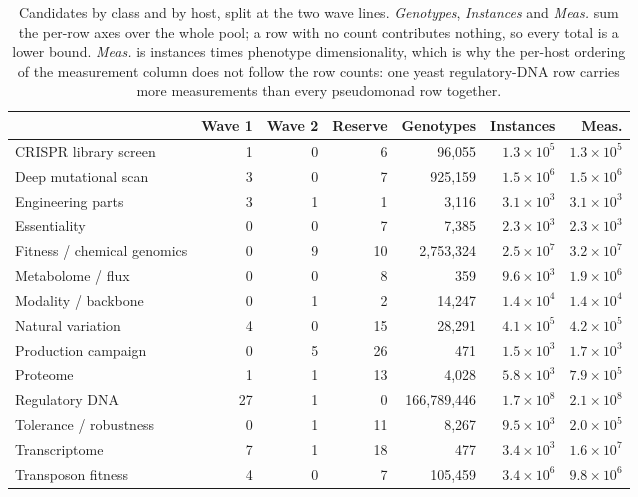 \begin{table}[H]\centering
\small
\caption[]{Candidates by class and by host, split at the two wave lines.
\emph{Genotypes}, \emph{Instances} and \emph{Meas.} sum the per-row axes over the whole
pool; a row with no count contributes nothing, so every total is a lower bound.
\emph{Meas.} is instances times phenotype dimensionality, which is why the per-host
ordering of the measurement column does not follow the row counts: one yeast
regulatory-DNA row carries more measurements than every pseudomonad row together.}
\label{tab:counts}
\begin{tabular}{@{}l r r r r r r@{}}
\toprule
 & Wave 1 & Wave 2 & Reserve & Genotypes & Instances & Meas. \\
\midrule
CRISPR library screen & 1 & 0 & 6 & 96,055 & $1.3\times 10^{5}$ & $1.3\times 10^{5}$ \\
Deep mutational scan & 3 & 0 & 7 & 925,159 & $1.5\times 10^{6}$ & $1.5\times 10^{6}$ \\
Engineering parts & 3 & 1 & 1 & 3,116 & $3.1\times 10^{3}$ & $3.1\times 10^{3}$ \\
Essentiality & 0 & 0 & 7 & 7,385 & $2.3\times 10^{3}$ & $2.3\times 10^{3}$ \\
Fitness / chemical genomics & 0 & 9 & 10 & 2,753,324 & $2.5\times 10^{7}$ & $3.2\times 10^{7}$ \\
Metabolome / flux & 0 & 0 & 8 & 359 & $9.6\times 10^{3}$ & $1.9\times 10^{6}$ \\
Modality / backbone & 0 & 1 & 2 & 14,247 & $1.4\times 10^{4}$ & $1.4\times 10^{4}$ \\
Natural variation & 4 & 0 & 15 & 28,291 & $4.1\times 10^{5}$ & $4.2\times 10^{5}$ \\
Production campaign & 0 & 5 & 26 & 471 & $1.5\times 10^{3}$ & $1.7\times 10^{3}$ \\
Proteome & 1 & 1 & 13 & 4,028 & $5.8\times 10^{3}$ & $7.9\times 10^{5}$ \\
Regulatory DNA & 27 & 1 & 0 & 166,789,446 & $1.7\times 10^{8}$ & $2.1\times 10^{8}$ \\
Tolerance / robustness & 0 & 1 & 11 & 8,267 & $9.5\times 10^{3}$ & $2.0\times 10^{5}$ \\
Transcriptome & 7 & 1 & 18 & 477 & $3.4\times 10^{3}$ & $1.6\times 10^{7}$ \\
Transposon fitness & 4 & 0 & 7 & 105,459 & $3.4\times 10^{6}$ & $9.8\times 10^{6}$ \\

\end{tabular}
\end{table}
